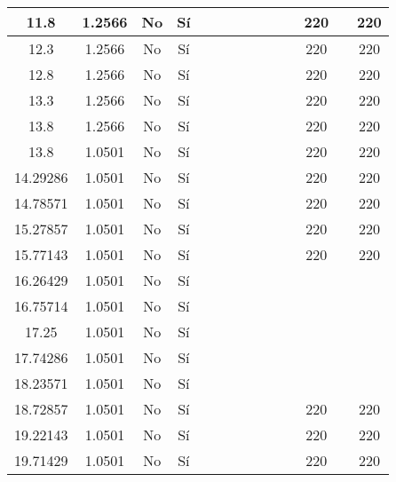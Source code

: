 \begin{table}[H]
{\begin{tabular}{|c|c|c|c|c|c|c|c|c|c|c|c|c|c|}
\hline
11.8 & 1.2566 & No  & Sí  &     &     &     &     &     &     &     & 220 &     & 220 \bigstrut\\
\hline
12.3 & 1.2566 & No  & Sí  &     &     &     &     &     &     &     & 220 &     & 220 \bigstrut\\
\hline
12.8 & 1.2566 & No  & Sí  &     &     &     &     &     &     &     & 220 &     & 220 \bigstrut\\
\hline
13.3 & 1.2566 & No  & Sí  &     &     &     &     &     &     &     & 220 &     & 220 \bigstrut\\
\hline
13.8 & 1.2566 & No  & Sí  &     &     &     &     &     &     &     & 220 &     & 220 \bigstrut\\
\hline
13.8 & 1.0501 & No  & Sí  &     &     &     &     &     &     &     & 220 &     & 220 \bigstrut\\
\hline
14.29286 & 1.0501 & No  & Sí  &     &     &     &     &     &     &     & 220 &     & 220 \bigstrut\\
\hline
14.78571 & 1.0501 & No  & Sí  &     &     &     &     &     &     &     & 220 &     & 220 \bigstrut\\
\hline
15.27857 & 1.0501 & No  & Sí  &     &     &     &     &     &     &     & 220 &     & 220 \bigstrut\\
\hline
15.77143 & 1.0501 & No  & Sí  &     &     &     &     &     &     &     & 220 &     & 220 \bigstrut\\
\hline
16.26429 & 1.0501 & No  & Sí  &     &     &     &     &     &     &     &     &     &  \bigstrut\\
\hline
16.75714 & 1.0501 & No  & Sí  &     &     &     &     &     &     &     &     &     &  \bigstrut\\
\hline
17.25 & 1.0501 & No  & Sí  &     &     &     &     &     &     &     &     &     &  \bigstrut\\
\hline
17.74286 & 1.0501 & No  & Sí  &     &     &     &     &     &     &     &     &     &  \bigstrut\\
\hline
18.23571 & 1.0501 & No  & Sí  &     &     &     &     &     &     &     &     &     &  \bigstrut\\
\hline
18.72857 & 1.0501 & No  & Sí  &     &     &     &     &     &     &     & 220 &     & 220 \bigstrut\\
\hline
19.22143 & 1.0501 & No  & Sí  &     &     &     &     &     &     &     & 220 &     & 220 \bigstrut\\
\hline
19.71429 & 1.0501 & No  & Sí  &     &     &     &     &     &     &     & 220 &     & 220 \bigstrut\\

\end{tabular}}
\end{table}
